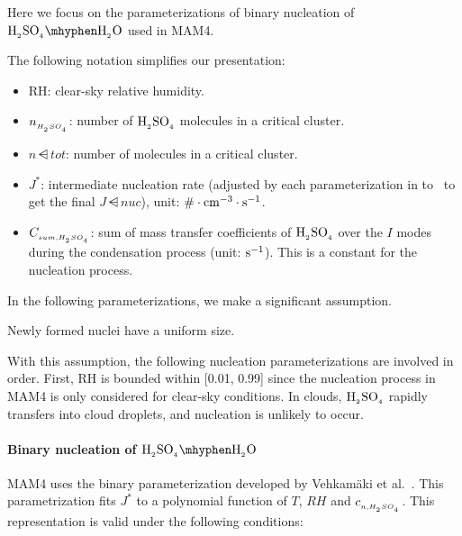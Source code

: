 Here we focus on the parameterizations of binary nucleation of
$\rsag \mhyphen \rwater$ used in MAM4.

The following notation simplifies our presentation:
\begin{itemize}
  \item RH: clear-sky relative humidity.
  \item $n_{_{H_{_2}SO_{_4}}}$: number of $\rm H_{_2}SO_{_4}$ molecules in a critical cluster.
  \item $n\dsub{tot}$: number of molecules in a critical cluster.
  \item $J^*$: intermediate nucleation rate (adjusted by each parameterization
        in  to~ to get
        the final $J\dsub{nuc}$), unit: $\rm \# \cdot cm^{-3} \cdot s^{-1}$.
  \item $C_{_{sum,H_{_2}SO_{_4}}}$: sum of mass transfer coefficients of
        $\rm H_{_2}SO_{_4}$ over the $I$ modes during the condensation process (unit:
        $\rm s^{-1}$). This is a constant for the nucleation process.
\end{itemize}

In the following parameterizations, we make a significant assumption.

\begin{assume}
  Newly formed nuclei have a uniform size.
\end{assume}

With this assumption, the following nucleation parameterizations are involved
in order. First, RH is bounded within [0.01, 0.99] since the nucleation process
in MAM4 is only considered for clear-sky conditions. In clouds, $\rm H_{_2}SO_{_4}$
rapidly transfers into cloud droplets, and nucleation is unlikely to occur.

\paragraph{Binary nucleation of $\rsag \mhyphen \rwater$}

MAM4 uses the binary parameterization developed by
Vehkam\"aki et al.~\citep{vehkamaki-2002-jgr}. This parametrization fits $J^*$
to a polynomial function of $T$, $RH$ and $c_{_{n,H_{_2}SO_{_4}}}$. This representation
is valid under the following conditions:

